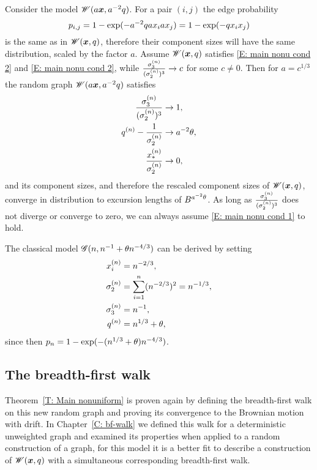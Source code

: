 Consider the model $\mathscr{W}(a\boldsymbol{x}, a^{-2}q)$.
For a pair $(i,j)$ the edge probability
\begin{equation}
	p_{i,j} = 1 - \exp(-a^{-2}q ax_iax_j) = 1 - \exp(-q x_ix_j)
\end{equation}
is the same as in $\mathscr{W}(\boldsymbol{x}, q)$,
therefore their component sizes will have the same distribution,
scaled by the factor $a$.
Assume $\mathscr{W}(\boldsymbol{x}, q)$ satisfies \eqref{E: main nonu cond 2} and \eqref{E: main nonu cond 2},
while $\frac{\sigma^{(n)}_3}{(\sigma^{(n)}_2)^3} \rightarrow c$ for some $c \neq 0$.
Then for $a = c^{1/3}$ the random graph $\mathscr{W}(a\boldsymbol{x}, a^{-2}q)$ satisfies
\begin{equation}
	\begin{aligned}
	\frac{\sigma^{(n)}_3}{(\sigma^{(n)}_2)^3} &\rightarrow 1, \\ 
	q^{(n)} - \frac{1}{\sigma^{(n)}_2} &\rightarrow a^{-2}\theta, \\
	\frac{x_*^{(n)}}{\sigma^{(n)}_2} &\rightarrow 0,
	\end{aligned}
\end{equation}
and its component sizes,
and therefore the rescaled component sizes of $\mathscr{W}(\boldsymbol{x}, q)$,
converge in distribution to excursion lengths of $B^{a^{-2}\theta}$.
As long as $\frac{\sigma^{(n)}_3}{(\sigma^{(n)}_2)^3}$ does not diverge or converge to zero,
we can always assume \eqref{E: main nonu cond 1} to hold.


The classical model $\mathscr{G}(n, n^{-1} + \theta n^{-4/3})$ can be derived by setting
\begin{equation}
\begin{aligned}
	x_i^{(n)} &= n^{-2 / 3},  \\
	\sigma^{(n)}_2 &= \sum_{i = 1}^{n} (n^{-2 / 3})^2 = n^{-1 / 3}, \\
	\sigma^{(n)}_3 &= n^{-1}, \\
	q^{(n)} &= n^{1 / 3} + \theta,
\end{aligned}
\end{equation}
since then $p_n = 1 - \exp(-(n^{1 / 3} + \theta)n^{-4 / 3})$.


\subsection{The breadth-first walk}

Theorem~\ref{T: Main nonuniform} is proven again by defining the breadth-first walk on this new random graph
and proving its convergence to the Brownian motion with drift.
In Chapter~\ref{C: bf-walk} we defined this walk for a deterministic unweighted graph 
and examined its properties when applied to a random construction of a graph,
for this model it is a better fit to describe a construction of $\mathscr{W}(\boldsymbol{x}, q)$ with a simultaneous corresponding breadth-first walk.

